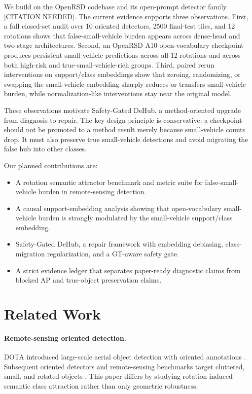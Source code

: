 \documentclass[letterpaper]{article}
\newcommand{\ours}{Safety-Gated DeHub}
\newcommand{\sv}{small-vehicle}
\begin{document}
We build on the OpenRSD codebase and its open-prompt detector family [CITATION NEEDED]. The current evidence supports three observations. First, a full closed-set audit over 10 oriented detectors, 2500 final-test tiles, and 12 rotations shows that false-\sv{} burden appears across dense-head and two-stage architectures. Second, an OpenRSD A10 open-vocabulary checkpoint produces persistent \sv{} predictions across all 12 rotations and across both high-risk and true-\sv{}-rich groups. Third, paired rerun interventions on support/class embeddings show that zeroing, randomizing, or swapping the \sv{} embedding sharply reduces or transfers \sv{} burden, while normalization-like interventions stay near the original model.

These observations motivate \ours{}, a method-oriented upgrade from diagnosis to repair. The key design principle is conservative: a checkpoint should not be promoted to a method result merely because \sv{} counts drop. It must also preserve true \sv{} detections and avoid migrating the false hub into other classes.

Our planned contributions are:
\begin{itemize}
  \item A rotation semantic attractor benchmark and metric suite for false-\sv{} burden in remote-sensing detection.
  \item A causal support-embedding analysis showing that open-vocabulary \sv{} burden is strongly modulated by the \sv{} support/class embedding.
  \item \ours{}, a repair framework with embedding debiasing, class-migration regularization, and a GT-aware safety gate.
  \item A strict evidence ledger that separates paper-ready diagnostic claims from blocked AP and true-object preservation claims.
\end{itemize}

\section{Related Work}

\paragraph{Remote-sensing oriented detection.}
DOTA introduced large-scale aerial object detection with oriented annotations \cite{xia2018dota}. Subsequent oriented detectors and remote-sensing benchmarks target cluttered, small, and rotated objects \cite{yang2018scrdet,long2021millionaid}. This paper differs by studying rotation-induced semantic class attraction rather than only geometric robustness.
\end{document}
